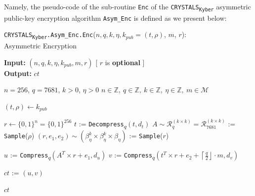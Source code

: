 \documentclass[runningheads]{llncs}
\numberwithin{equation}{section}
\begin{document}
    \noindent Namely, the pseudo-code of the sub-routine \texttt{Enc} of the \texorpdfstring{\texttt{CRYSTALS}\textsubscript{\texttt{Kyber}}}\/ asymmetric public-key encryption algorithm \texttt{Asym\_Enc} is defined as we present below:
    \vspace{-3.75ex}
    \begin{algorithm}
        \caption{\texorpdfstring{\texttt{CRYSTALS}\textsubscript{\texttt{Kyber}}\texttt{.Asym\_Enc}\texttt{.Enc}($n,q,k,\eta,{k}_{pub} = (t, \rho)$, $m$, $r$)}\/:\\ \phantom{|.............................................................................}Asymmetric Encryption}
        \label{subrou:crystals-kyber-asymmetric-encryption-enc}
        
        \textbf{Input:} $\left( n, q, k, \eta, {k}_{pub}, m, r \right)$ \phantom{....} [ $r$ is \textbf{optional} ]\\
        \textbf{Output:} $ ct $
        
        \begin{algorithmic}[1]
            \Require $n = 256$, $q = 7681$, $k > 0$, $\eta > 0$
            \Ensure $n \in \mathbb{Z},\ q \in \mathbb{Z},\ k \in \mathbb{Z},\ \eta \in \mathbb{Z},\ m \in \mathcal{M}$
        
            \vspace{2ex}

            \State $(t,\rho) \gets {k}_{pub}$
            
            \vspace{1ex}
            
                \State $r \gets { \{ 0 , 1 \} }^{n} = { \{ 0 , 1 \} }^{256}$
            \EndIf
            \State $t$ := \texttt{Decompress}\textsubscript{$q$}$(t, {d}_{t})$
            \State $A \sim {\mathcal{R}}_{q}^{( k \times k )} = {\mathcal{R}}_{7681}^{( k \times k )}$ := \texttt{Sample}($\rho$)
            \State $(r, {e}_{1}, {e}_{2}) \sim \left( {\beta}_{\eta}^{k} \times {\beta}_{\eta}^{k} \times {\beta}_{\eta} \right)$ := \texttt{Sample}($r$)

            \vspace{1ex}
            
            \State $u$ := \texttt{Compress}\textsubscript{$q$}$({A}^{T} \times r + {e}_{1}, {d}_{u})$
            \State $v$ := \texttt{Compress}\textsubscript{$q$}$({t}^{T} \times r + {e}_{2} + \left\lceil \frac{q}{2} \right\rfloor \cdot m, {d}_{v})$
            
            \vspace{1ex}

            \State $ct$ := $(u, v)$
            
            \vspace{1ex}
            
            \State \Return $ct$
        \end{algorithmic}
    \end{algorithm}
    \vspace{-3.5ex}
    
\end{document}
